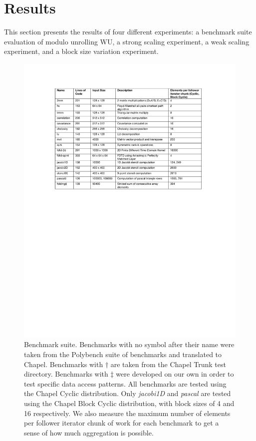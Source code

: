 \section{Results}\label{sec:results}

This section presents the results of four different experiments: a benchmark suite evaluation of modulo unrolling WU, a strong scaling experiment, a weak scaling experiment, and a block size variation experiment. 

\begin{figure}
\begin{center}
\includegraphics[width=\linewidth]{./Figures/Benchmarks.pdf}
\caption{Benchmark suite. Benchmarks with no symbol after their name were taken from the Polybench suite of benchmarks and translated to Chapel. Benchmarks with $\dagger$ are taken from the Chapel Trunk test directory. Benchmarks with $\ddagger$ were developed on our own in order to test specific data access patterns. All benchmarks are tested using the Chapel Cyclic distribution. Only \textit{jacobi1D} and \textit{pascal} are tested using the Chapel Block Cyclic distribution, with block sizes of 4 and 16 respectively. We also measure the maximum number of elements per follower iterator chunk of work for each benchmark to get a sense of how much aggregation is possible.}
\label{benchmarks}
\end{center}
\end{figure}

